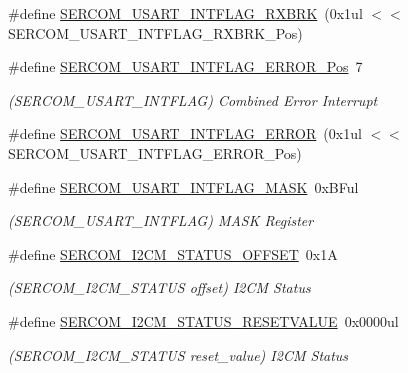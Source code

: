 \begin{DoxyCompactItemize}
\#define \mbox{\hyperlink{group___s_a_m_d21___s_e_r_c_o_m_ga6e4ed4479e6c5bc271d099226ba3f5e5}{S\+E\+R\+C\+O\+M\+\_\+\+U\+S\+A\+R\+T\+\_\+\+I\+N\+T\+F\+L\+A\+G\+\_\+\+R\+X\+B\+RK}}~(0x1ul $<$$<$ S\+E\+R\+C\+O\+M\+\_\+\+U\+S\+A\+R\+T\+\_\+\+I\+N\+T\+F\+L\+A\+G\+\_\+\+R\+X\+B\+R\+K\+\_\+\+Pos)
\item 
\#define \mbox{\hyperlink{group___s_a_m_d21___s_e_r_c_o_m_gaa5be9b8818225408ec458f9a32b0bde0}{S\+E\+R\+C\+O\+M\+\_\+\+U\+S\+A\+R\+T\+\_\+\+I\+N\+T\+F\+L\+A\+G\+\_\+\+E\+R\+R\+O\+R\+\_\+\+Pos}}~7
\begin{DoxyCompactList}\small\item\em (S\+E\+R\+C\+O\+M\+\_\+\+U\+S\+A\+R\+T\+\_\+\+I\+N\+T\+F\+L\+AG) Combined Error Interrupt \end{DoxyCompactList}\item 
\#define \mbox{\hyperlink{group___s_a_m_d21___s_e_r_c_o_m_ga65a043f1f4fb8f5ea0f7b63ac3b5fef5}{S\+E\+R\+C\+O\+M\+\_\+\+U\+S\+A\+R\+T\+\_\+\+I\+N\+T\+F\+L\+A\+G\+\_\+\+E\+R\+R\+OR}}~(0x1ul $<$$<$ S\+E\+R\+C\+O\+M\+\_\+\+U\+S\+A\+R\+T\+\_\+\+I\+N\+T\+F\+L\+A\+G\+\_\+\+E\+R\+R\+O\+R\+\_\+\+Pos)
\item 
\#define \mbox{\hyperlink{group___s_a_m_d21___s_e_r_c_o_m_gaf8b9fdb41c3fea2e45b096b7a369b542}{S\+E\+R\+C\+O\+M\+\_\+\+U\+S\+A\+R\+T\+\_\+\+I\+N\+T\+F\+L\+A\+G\+\_\+\+M\+A\+SK}}~0x\+B\+Ful
\begin{DoxyCompactList}\small\item\em (S\+E\+R\+C\+O\+M\+\_\+\+U\+S\+A\+R\+T\+\_\+\+I\+N\+T\+F\+L\+AG) M\+A\+SK Register \end{DoxyCompactList}\item 
\#define \mbox{\hyperlink{group___s_a_m_d21___s_e_r_c_o_m_gac51f2c98aeb1164b1913f0c93d8ac864}{S\+E\+R\+C\+O\+M\+\_\+\+I2\+C\+M\+\_\+\+S\+T\+A\+T\+U\+S\+\_\+\+O\+F\+F\+S\+ET}}~0x1A
\begin{DoxyCompactList}\small\item\em (S\+E\+R\+C\+O\+M\+\_\+\+I2\+C\+M\+\_\+\+S\+T\+A\+T\+US offset) I2\+CM Status \end{DoxyCompactList}\item 
\#define \mbox{\hyperlink{group___s_a_m_d21___s_e_r_c_o_m_ga156623b8470f6f8d4e8790684776c257}{S\+E\+R\+C\+O\+M\+\_\+\+I2\+C\+M\+\_\+\+S\+T\+A\+T\+U\+S\+\_\+\+R\+E\+S\+E\+T\+V\+A\+L\+UE}}~0x0000ul
\begin{DoxyCompactList}\small\item\em (S\+E\+R\+C\+O\+M\+\_\+\+I2\+C\+M\+\_\+\+S\+T\+A\+T\+US reset\+\_\+value) I2\+CM Status \end{DoxyCompactList}\item 

\end{DoxyCompactItemize}
